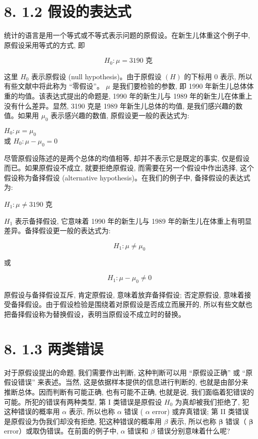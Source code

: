 \documentclass[10pt]{article}
\begin{document}
\begin{CJK*}{UTF8}{bsmi}
\section*{8. 1.2 假设的表达式}
统计的语言是用一个等式或不等式表示问题的原假设。在新生儿体重这个例子中, 原假设采用等式的方式, 即

$$
H_{0}: \mu=3190 \text { 克 }
$$

这里 $H_{0}$ 表示原假设 (null hypothesis)。由于原假设 $(H)$ 的下标用 0 表示, 所以有些文献中将此称为 “零假设”。 $\mu$ 是我们要检验的参数, 即 1990 年新生儿总体体重的均值。该表达式提出的命题是, 1990 年的新生儿与 1989 年的新生儿在体重上没有什么差异。显然, 3190 克是 1989 年新生儿总体的均值, 是我们感兴趣的数值。如果用 $\mu_{0}$ 表示感兴趣的数值, 原假设更一般的表达式为:

$H_{0}: \mu=\mu_{0}$\\
或 $H_{0}: \mu-\mu_{0}=0$

尽管原假设陈述的是两个总体的均值相等, 却并不表示它是既定的事实, 仅是假设而已。如果原假设不成立, 就要拒绝原假设, 而需要在另一个假设中作出选择, 这个假设称为备择假设 (alternative hypothesis)。在我们的例子中, 备择假设的表达式为:

$H_{1}: \mu \neq 3190$ 克

$H_{1}$ 表示备择假设, 它意味着 1990 年的新生儿与 1989 年的新生儿在体重上有明显差异。备择假设更一般的表达式为:

$$
H_{1}: \mu \neq \mu_{0}
$$

或

$$
H_{1}: \mu-\mu_{0} \neq 0
$$

原假设与备择假设互斥, 肯定原假设, 意味着放弃备择假设; 否定原假设, 意味着接受备择假设。由于假设检验是围绕着对原假设是否成立而展开的, 所以有些文献也把备择假设称为替换假设，表明当原假设不成立时的替换。

\section*{8. 1.3 两类错误}
对于原假设提出的命题, 我们需要作出判断, 这种判断可以用 “原假设正确” 或 “原假设错误” 来表述。当然, 这是依据样本提供的信息进行判断的, 也就是由部分来推断总体。因而判断有可能正确, 也有可能不正确, 也就是说, 我们面临着犯错误的可能。所犯的错误有两种类型, 第 I 类错误是原假设 $H_{0}$ 为真却被我们拒绝了, 犯这种错误的概率用 $\alpha$ 表示, 所以也称 $\alpha$ 错误 ( $\alpha$ error) 或弃真错误; 第 II 类错误是原假设为伪我们却没有拒绝, 犯这种错误的概率用 $\beta$ 表示, 所以也称 $\boldsymbol{\beta}$ 错误（ $\boldsymbol{\beta}$ error）或取伪错误。在前面的例子中, $\alpha$ 错误和 $\beta$ 错误分别意味着什么呢?


\end{CJK*}
\end{document}
